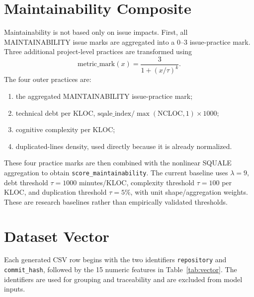 \documentclass[12pt,a4paper,oneside]{report}
\newcommand{\code}[1]{\nolinkurl{#1}}
\begin{document}
\section{Maintainability Composite}
Maintainability is not based only on issue impacts. First, all MAINTAINABILITY issue marks are aggregated into a 0--3 issue-practice mark. Three additional project-level practices are transformed using
\begin{equation}
\mathrm{metric\_mark}(x)=\frac{3}{1+(x/\tau)^k}.
\end{equation}
The four outer practices are:
\begin{enumerate}[leftmargin=*]
    \item the aggregated MAINTAINABILITY issue-practice mark;
    \item technical debt per KLOC, $\mathrm{sqale\_index}/\max(\mathrm{NCLOC},1)\times1000$;
    \item cognitive complexity per KLOC;
    \item duplicated-lines density, used directly because it is already normalized.
\end{enumerate}
These four practice marks are then combined with the nonlinear SQUALE aggregation to obtain \code{score\_maintainability}. The current baseline uses $\lambda=9$, debt threshold $\tau=1000$ minutes/KLOC, complexity threshold $\tau=100$ per KLOC, and duplication threshold $\tau=5\%$, with unit shape/aggregation weights. These are research baselines rather than empirically validated thresholds.

\section{Dataset Vector}
Each generated CSV row begins with the two identifiers \code{repository} and \code{commit\_hash}, followed by the 15 numeric features in Table~\ref{tab:vector}. The identifiers are used for grouping and traceability and are excluded from model inputs.
\end{document}

